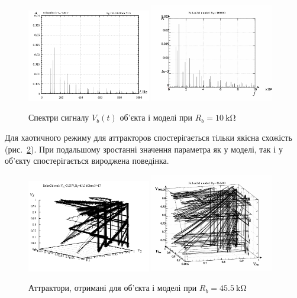 \begin{figure}[htb!]
  \centerline{
    \hfill
    \includegraphics[width=0.48\textwidth]{p/relax3_f_03.png}
    \hfill
    \includegraphics[width=0.48\textwidth]{p/relax3d_read_q-p_fm_03a.png}
    \hfill
  }
\caption{Спектри сигналу $ V_b (t) $ об'єкта і моделі при $ R_b = \SI{10}{\kilo \ohm} $}
\label{atu:f:relax3d_mo_f_03}
\end{figure}

Для хаотичного режиму для аттракторов спостерігається тільки
якісна схожість (рис.~\ref{atu:f:relax3d_mo_v1v2v3m_17}). При подальшому
зростанні значення параметра як у моделі, так і у об'єкту
спостерігається вироджена поведінка.


\begin{figure}[htb!]
  \centerline{
    \hfill
    \includegraphics[width=0.48\textwidth]{p/relax3_v1v2v3_17.png}
    \hfill
    \includegraphics[width=0.48\textwidth]{p/relax3d_read_q-p_v1v2v3m_17a.png}
    \hfill
  }
\caption{Аттрактори, отримані для об'єкта і моделі при $ R_b = \SI{45.5}{\kilo \ohm} $}
  \label{atu:f:relax3d_mo_v1v2v3m_17}
\end{figure}


